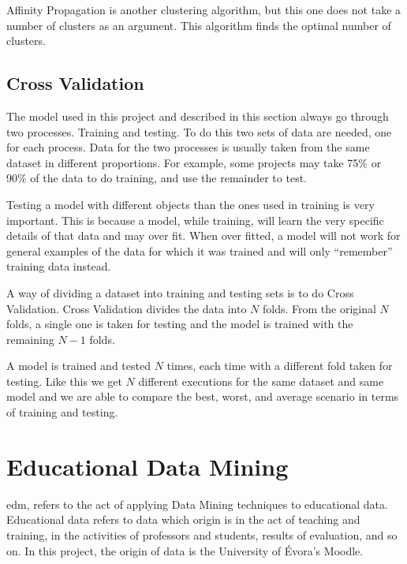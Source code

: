 Affinity Propagation is another clustering algorithm, but this one does not
take a number of clusters as an argument. This algorithm finds the optimal
number of clusters.~\cite{book_ml,book_dm_practical}

\subsection{Cross Validation}
\label{sec:cross_val}

The model used in this project and described in this section always go through
two processes. Training and testing. To do this two sets of data are needed,
one for each process. Data for the two processes is usually taken from the same
dataset in different proportions. For example, some projects may take 75\% or
90\% of the data to do training, and use the remainder to test.

Testing a model with different objects than the ones used in training is very
important. This is because a model, while training, will learn the very
specific details of that data and may over fit. When over fitted, a model will
not work for general examples of the data for which it was trained and will
only ``remember'' training data instead.

A way of dividing a dataset into training and testing sets is to do Cross
Validation. Cross Validation divides the data into $ N $ folds. From the
original $ N $ folds, a single one is taken for testing and the model is
trained with the remaining $ N - 1 $ folds.

A model is trained and tested $ N $ times, each time with a different fold
taken for testing. Like this we get $ N $ different executions for the same
dataset and same model and we are able to compare the best, worst, and average
scenario in terms of training and testing.~\cite{book_dm_practical}

\section{Educational Data Mining}

\acrfull{edm}, refers to the act of applying Data Mining techniques to
educational data. Educational data refers to data which origin is in the act of
teaching and training, in the activities of professors and students, results of
evaluation, and so on. In this project, the origin of data is the University of
Évora's Moodle.


